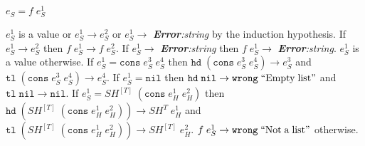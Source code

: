 \begin{case}
$e_{S}=f\;e_{S}^{1}$

$e_{S}^{1}$ is a value or $e_{S}^{1}\rightarrow e_{S}^{2}$ or $e_{S}^{1}\rightarrow$ \emph{\textbf{Error}:\;string} by the induction hypothesis.  If $e_{S}^{1}\rightarrow e_{S}^{2}$ then $f\;e_{S}^{1}\rightarrow f\;e_{S}^{2}$.  If $e_{S}^{1}\rightarrow$ \emph{\textbf{Error}:\;string} then $f\;e_{S}^{1}\rightarrow$ \emph{\textbf{Error}:\;string}.  $e_{S}^{1}$ is a value otherwise.  If $e_{S}^{1}=\mathtt{cons}\;e_{S}^{3}\;e_{S}^{4}$ then $\mathtt{hd}\;(\mathtt{cons}\;e_{S}^{3}\;e_{S}^{4})\rightarrow e_{S}^{3}$ and $\mathtt{tl}\;(\mathtt{cons}\;e_{S}^{3}\;e_{S}^{4})\rightarrow e_{S}^{4}$.  If $e_{S}^{1}=\mathtt{nil}$ then $\mathtt{hd}\;\mathtt{nil}\rightarrow\mathtt{wrong}\;\mathrm{``Empty\;list"}$ and $\mathtt{tl}\;\mathtt{nil}\rightarrow\mathtt{nil}$.  If $e_{S}^{1}=SH^{[T]}\;(\mathtt{cons}\;e_{H}^{1}\;e_{H}^{2})$ then $\mathtt{hd}\;(SH^{[T]}\;(\mathtt{cons}\;e_{H}^{1}\;e_{H}^{2}))\rightarrow SH^{T}\;e_{H}^{1}$ and $\mathtt{tl}\;(SH^{[T]}\;(\mathtt{cons}\;e_{H}^{1}\;e_{H}^{2}))\rightarrow SH^{[T]}\;e_{H}^{2}$.  $f\;e_{S}^{1}\rightarrow\mathtt{wrong}\;\mathrm{``Not\;a\;list"}$ otherwise.
\end{case}